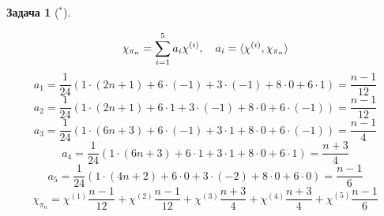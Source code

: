 \documentclass[12pt]{article}
\theoremstyle{definition}
\newtheorem{zad}{Задача}[section]
\begin{document}
\begin{zad}[$^*$]
\begin{itemize}
\begin{enumerate}
\begin{equation}
        \chi_{\pi_n}=\sum\limits_{i=1}^5 a_i\chi^{(i)},\quad a_i=\braket{\chi^{(i)},\chi_{\pi_n}}
    \end{equation}
    \begin{equation}
        a_1=\frac{1}{24}(1\cdot(2n+1)+6\cdot(-1)+3\cdot(-1)+8\cdot0+6\cdot1)=\frac{n-1}{12}
    \end{equation}
    \begin{equation}
        a_2=\frac{1}{24}(1\cdot(2n+1)+6\cdot1+3\cdot(-1)+8\cdot0+6\cdot(-1))=\frac{n-1}{12}
    \end{equation}
    \begin{equation}
        a_3=\frac{1}{24}(1\cdot(6n+3)+6\cdot(-1)+3\cdot1+8\cdot0+6\cdot(-1))=\frac{n-1}{4}
    \end{equation}
    \begin{equation}
        a_4=\frac{1}{24}(1\cdot(6n+3)+6\cdot1+3\cdot1+8\cdot0+6\cdot1)=\frac{n+3}{4}
    \end{equation}
    \begin{equation}
        a_5=\frac{1}{24}(1\cdot(4n+2)+6\cdot0+3\cdot(-2)+8\cdot0+6\cdot0)=\frac{n-1}{6}
    \end{equation}
    \begin{equation}
        \boxed{\chi_{\pi_n}=\chi^{(1)}\frac{n-1}{12}+\chi^{(2)}\frac{n-1}{12}+\chi^{(3)}\frac{n+3}{4}+\chi^{(4)}\frac{n+3}{4}+\chi^{(5)}\frac{n-1}{6}}
    \end{equation}
    

\end{enumerate}
\end{itemize}
\end{zad}
\end{document}

